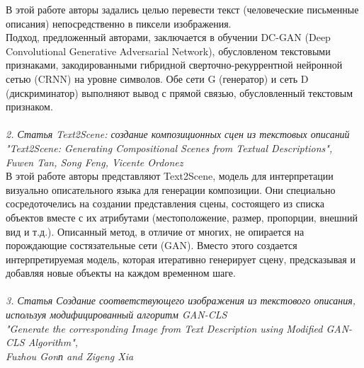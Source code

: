 \documentclass{article}
\begin{document}
    В этой работе авторы задались целью перевести текст (человеческие письменные описания) непосредственно в пиксели изображения.
    \\
    Подход, предложенный авторами, заключается в обучении DC-GAN (Deep Convolutional Generative Adversarial Network), обусловленом текстовыми признаками, закодированными гибридной сверточно-рекуррентной нейронной сетью (CRNN) на уровне символов. Обе сети G (генератор) и сеть D (дискриминатор) выполняют вывод с прямой связью, обусловленный текстовым признаком.
    \\ \\
    \textit{2. Статья Text2Scene: создание композиционных сцен из текстовых описаний
    \\
    "Text2Scene: Generating Compositional Scenes from Textual Descriptions", 
    \\
    Fuwen Tan, Song Feng, Vicente Ordonez}
    \\

    В этой работе авторы представляют Text2Scene, модель для интерпретации визуально описательного языка для генерации композиции. Они специально сосредоточелись на создании представления сцены, состоящего из списка объектов вместе с их атрибутами (местоположение, размер, пропорции, внешний вид и т.д.). Описанный метод, в отличие от многих, не опирается на порождающие состязательные сети (GAN). Вместо этого создается интерпретируемая модель, которая итеративно генерирует сцену, предсказывая и добавляя новые объекты на каждом временном шаге.
    \\ \\
    \textit{3. Статья Создание соответствующего изображения из текстового описания, используя модифицированный алгоритм GAN-CLS
    \\
    "Generate the corresponding Image from Text Description using Modified GAN-CLS Algorithm", 
    \\
    Fuzhou Gonп and Zigeng Xia}
    \\
\end{document}
